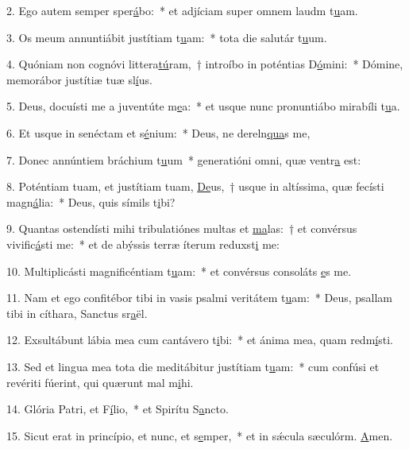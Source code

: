 2. Ego autem semper sper\uline{á}bo:~* et adjíciam super omnem laudm t\uline{u}am.\par 
3. Os meum annuntiábit justítiam t\uline{u}am:~* tota die salutár t\uline{u}um.\par 
4. Quóniam non cognóvi littera\uline{tú}ram,~† introíbo in poténtias D\uline{ó}mini:~* Dómine, memorábor justítiæ tuæ sl\uline{í}us.\par 
5. Deus, docuísti me a juventúte m\uline{e}a:~* et usque nunc pronuntiábo mirabíli t\uline{u}a.\par 
6. Et usque in senéctam et s\uline{é}nium:~* Deus, ne dereln\uline{qua}s me,\par 
7. Donec annúntiem bráchium t\uline{u}um~* generatióni omni, quæ ventr\uline{a} est:\par 
8. Poténtiam tuam, et justítiam tuam, \uline{De}us,~† usque in altíssima, quæ fecísti magn\uline{á}lia:~* Deus, quis símils t\uline{i}bi?\par 
9. Quantas ostendísti mihi tribulatiónes multas et \uline{ma}las:~† et convérsus vivific\uline{á}sti me:~* et de abýssis terræ íterum reduxst\uline{i} me:\par 
10. Multiplicásti magnificéntiam t\uline{u}am:~* et convérsus consoláts \uline{e}s me.\par 
11. Nam et ego confitébor tibi in vasis psalmi veritátem t\uline{u}am:~* Deus, psallam tibi in cíthara, Sanctus sr\uline{a}ël.\par 
12. Exsultábunt lábia mea cum cantávero t\uline{i}bi:~* et ánima mea, quam redm\uline{í}sti.\par 
13. Sed et lingua mea tota die meditábitur justítiam t\uline{u}am:~* cum confúsi et revériti fúerint, qui quærunt mal m\uline{i}hi.\par 
14. Glória Patri, et F\uline{í}lio,~* et Spirítu S\uline{a}ncto.\par 
15. Sicut erat in princípio, et nunc, et s\uline{e}mper,~* et in sǽcula sæculórm. \uline{A}men.\par 
